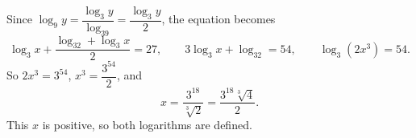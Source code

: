 Since $\log_9y=\dfrac{\log_3y}{\log_39}=\dfrac{\log_3y}{2}$, the equation becomes
\[\log_3x+\dfrac{\log_32+\log_3x}{2}=27,\qquad 3\log_3x+\log_32=54,\qquad \log_3\left(2x^3\right)=54 .\]
So $2x^3=3^{54}$, $x^3=\dfrac{3^{54}}{2}$, and
\[x=\boxed{\dfrac{3^{18}}{\sqrt[3]{2}}}=\dfrac{3^{18}\sqrt[3]{4}}{2}.\]
This $x$ is positive, so both logarithms are defined.
